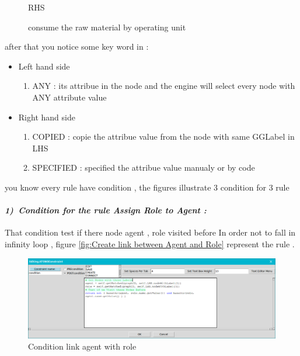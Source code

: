 \begin{figure}[th]
\begin{minipage}{.6\textwidth}
\hspace{2.5cm}  RHS 
 
\end{minipage}
\caption{\label{fig:consume the raw material by operating unit} consume the raw material by operating unit}
 
\end{figure}
\vspace{1cm}

after that you notice some key word in  :
\begin{itemize}
\item Left hand side
	\begin{enumerate}
	\item ANY : its attribue in the node and the engine will select every node with ANY attribute value
	\end{enumerate}
\item  Right hand side
	\begin{enumerate}
	\item COPIED : copie the attribue value from the node with same GGLabel in LHS
	\item SPECIFIED : specified the attribue value manualy or by code 
	\end{enumerate}
\end{itemize}
 
you know  every rule have condition , the figures illustrate 3 condition for 3 rule 

 
\paragraph{\emph{1)~Condition for the rule   Assign Role to Agent  :  } } 
 
That condition test if there node agent , role visited before 
In order not to fall in infinity loop , figure \ref{fig:Create link between Agent and Role} represent the rule .
 
\begin{figure}[th]
	\centering
 	\includegraphics[scale=0.8]{Chapiter3/img/condrule1}
	\caption{\label{fig:Condition link agent with role}Condition link agent with role  }
\end{figure} 
\pagebreak 
